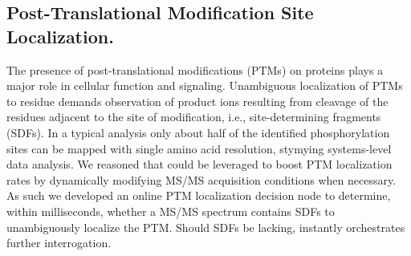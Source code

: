 \subsection*{Post-Translational Modification Site Localization.}

The presence of post-translational modifications (PTMs) on proteins plays a major role in cellular function and signaling. Unambiguous localization of PTMs to residue demands observation of product ions resulting from cleavage of the residues adjacent to the site of modification, i.e., site-determining fragments (SDFs). In a typical analysis only about half of the identified phosphorylation sites can be mapped with single amino acid resolution, stymying systems-level data analysis. We reasoned that \inseq{} could be leveraged to boost PTM localization rates by dynamically modifying MS/MS acquisition conditions when necessary. As such we developed an online PTM localization decision node to determine, within milliseconds, whether a MS/MS spectrum contains SDFs to unambiguously localize the PTM. Should SDFs be lacking, \inseq{} instantly orchestrates further interrogation.

